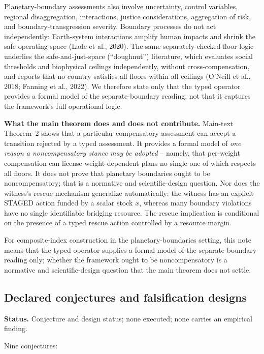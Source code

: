 \documentclass[preprint,11pt,authoryear]{elsarticle}
\theoremstyle{remark}
\begin{document}
Planetary-boundary assessments also involve uncertainty, control variables, regional disaggregation, interactions, justice considerations, aggregation of risk, and boundary-transgression severity. Boundary processes do not act independently: Earth-system interactions amplify human impacts and shrink the safe operating space (Lade et al., 2020). The same separately-checked-floor logic underlies the safe-and-just-space (``doughnut'') literature, which evaluates social thresholds and biophysical ceilings independently, without cross-compensation, and reports that no country satisfies all floors within all ceilings (O'Neill et al., 2018; Fanning et al., 2022). We therefore state only that the typed operator provides a formal model of the separate-boundary reading, not that it captures the framework's full operational logic.

\textbf{What the main theorem does and does not contribute.} Main-text Theorem~2 shows that a particular compensatory assessment can accept a transition rejected by a typed assessment. It provides a formal model of \emph{one reason a noncompensatory stance may be adopted} -- namely, that per-weight compensation can license weight-dependent plans no single one of which respects all floors. It does not prove that planetary boundaries ought to be noncompensatory; that is a normative and scientific-design question. Nor does the witness's rescue mechanism generalize automatically: the witness has an explicit STAGED action funded by a scalar stock $x$, whereas many boundary violations have no single identifiable bridging resource. The rescue implication is conditional on the presence of a typed rescue action controlled by a resource margin.

For composite-index construction in the planetary-boundaries setting, this note means that the typed operator supplies a formal model of the separate-boundary reading only; whether the framework ought to be noncompensatory is a normative and scientific-design question that the main theorem does not settle.

\subsection{Declared conjectures and falsification designs}

\noindent\textbf{Status.} Conjecture and design status; none executed; none carries an empirical finding.

Nine conjectures:
\end{document}
